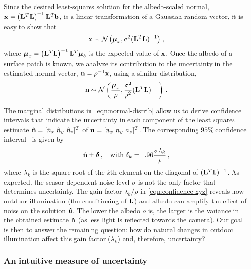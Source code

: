 Since the desired least-squares solution for the albedo-scaled normal, ${\bf x} = \left({\bf L}^T{\bf L}\right)^{-1}{\bf L}^T{\bf b}$, is a linear transformation of a Gaussian random vector, it is easy to show that
%
\begin{equation}
{\bf x} \sim \mathcal{N} \left( \boldsymbol \mu_x, \sigma^2({\bf L}^T{\bf L})^{-1} \right)\,,
\end{equation}
where $\boldsymbol \mu_x = \left({\bf L}^T{\bf L}\right)^{-1}{\bf L}^T\boldsymbol \mu_b$ is the expected value of ${\bf x}$.
Once the albedo of a surface patch is known, we analyze its contribution to the uncertainty in the estimated normal vector, ${\bf n} = \rho^{-1}{\bf x}$, using a similar distribution,
%
\begin{equation}
{\bf n} \sim \mathcal{N} \left( \frac{\boldsymbol \mu_x}{\rho}, \frac{\sigma^2}{\rho^2}({\bf L}^T{\bf L})^{-1} \right)\,.
\label{eqn:normal-distrib}
\end{equation}

The marginal distributions in~\eqref{eqn:normal-distrib} allow us to derive confidence intervals that indicate the uncertainty in each component of the least squares estimate ${\bf \hat n} = [ \hat n_x \ \hat n_y \ \hat n_z ]^T$ of ${\bf n} = [ n_x \ n_y \ n_z ]^T$. The corresponding $95\%$ confidence interval~\cite{hastie-book-09} is given by
%
\begin{equation}
\hat{\mathbf{n}} \pm \boldsymbol \delta \,, \quad \text{with } \delta_k = 1.96 \frac{\sigma\lambda_k}{\rho} \,,
\label{eqn:confidence-xyz}
\end{equation}
%
where $\lambda_k$ is the square root of the $k$th element on the diagonal of $({\bf L}^T{\bf L})^{-1}$. As expected, the sensor-dependent noise level $\sigma$ is not the only factor that determines uncertainty. The gain factor $\lambda_k/\rho$ in \eqref{eqn:confidence-xyz} reveals how outdoor illumination (the conditioning of ${\bf L}$) and albedo can amplify the effect of noise on the solution ${\bf \hat n}$. The lower the albedo $\rho$ is, the larger is the variance in the obtained estimate $\bf \hat n$ (as less light is reflected towards the camera). Our goal is then to answer the remaining question: how do natural changes in outdoor illumination affect this gain factor ($\lambda_k$) and, therefore, uncertainty?

\subsubsection{An intuitive measure of uncertainty}
\label{subsec:measure_uncertainty}

